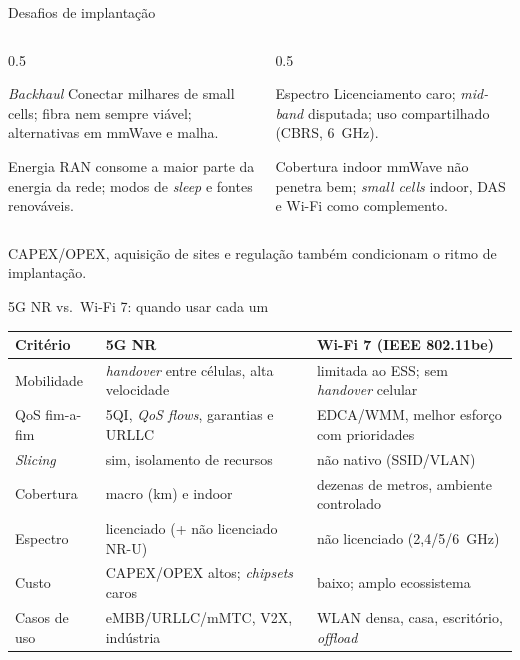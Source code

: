 \documentclass[aspectratio=169,11pt]{beamer}
\begin{document}
\begin{frame}{Desafios de implantação}
  \begin{columns}
    \begin{column}{0.5\textwidth}
      \begin{block}{\emph{Backhaul}}
        Conectar milhares de small cells; fibra nem sempre viável; alternativas em mmWave e malha.
      \end{block}
      \begin{block}{Energia}
        RAN consome a maior parte da energia da rede; modos de \emph{sleep} e fontes renováveis.
      \end{block}
    \end{column}
    \begin{column}{0.5\textwidth}
      \begin{alertblock}{Espectro}
        Licenciamento caro; \emph{mid-band} disputada; uso compartilhado (CBRS, 6~GHz).
      \end{alertblock}
      \begin{alertblock}{Cobertura indoor}
        mmWave não penetra bem; \emph{small cells} indoor, DAS e Wi-Fi como complemento.
      \end{alertblock}
    \end{column}
  \end{columns}
  \begin{center}
    {\scriptsize CAPEX/OPEX, aquisição de sites e regulação também condicionam o ritmo de implantação.}
  \end{center}
\end{frame}

\begin{frame}{5G NR vs.\ Wi-Fi 7: quando usar cada um}
  \begin{center}
    \scriptsize
    \begin{tabular}{@{}p{2.6cm}p{5.0cm}p{5.0cm}@{}}
      \toprule
      \textbf{Critério} & \textbf{5G NR} & \textbf{Wi-Fi 7 (IEEE 802.11be)}\\
      \midrule
      Mobilidade & \emph{handover} entre células, alta velocidade & limitada ao ESS; sem \emph{handover} celular\\
      QoS fim-a-fim & 5QI, \emph{QoS flows}, garantias e URLLC & EDCA/WMM, melhor esforço com prioridades\\
      \emph{Slicing} & sim, isolamento de recursos & não nativo (SSID/VLAN)\\
      Cobertura & macro (km) e indoor & dezenas de metros, ambiente controlado\\
      Espectro & licenciado (+ não licenciado NR-U) & não licenciado (2,4/5/6~GHz)\\
      Custo & CAPEX/OPEX altos; \emph{chipsets} caros & baixo; amplo ecossistema\\
      Casos de uso & eMBB/URLLC/mMTC, V2X, indústria & WLAN densa, casa, escritório, \emph{offload}\\
      \bottomrule
    \end{tabular}
  \end{center}
\end{frame}
\end{document}
